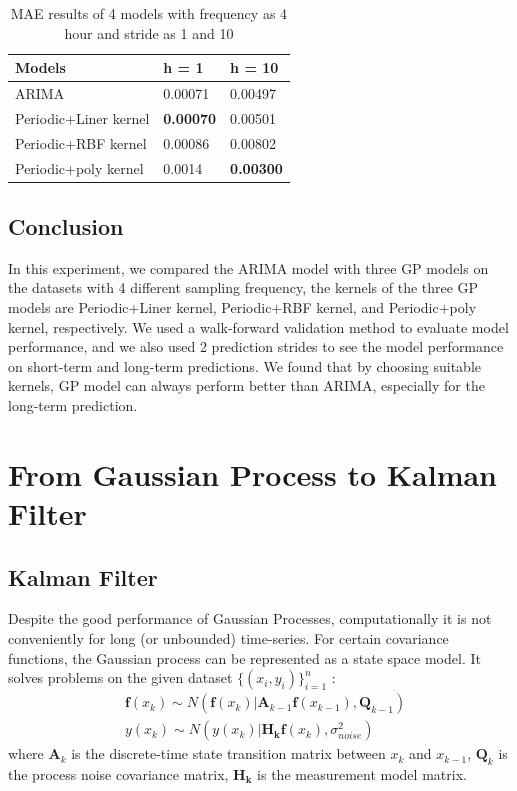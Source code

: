 \documentclass[12pt]{article}
\begin{document}
\begin{table}[H]
\centering
\begin{tabular}{|l|l|l|}
\hline
Models                      & h = 1            & h = 10           \\ \hline
ARIMA                 & 0.00071          & 0.00497          \\ \hline
Periodic+Liner kernel & \textbf{0.00070} & 0.00501          \\ \hline
Periodic+RBF kernel   & 0.00086          & 0.00802          \\ \hline
Periodic+poly kernel  & 0.0014           & \textbf{0.00300} \\ \hline
\end{tabular}
\caption{MAE results of 4 models with frequency as 4 hour and stride as 1 and 10}
\end{table} 

\subsection{Conclusion}
In this experiment, we compared the ARIMA model with three GP models on the datasets with 4 different sampling frequency, the kernels of the three GP models are Periodic+Liner kernel, Periodic+RBF kernel, and Periodic+poly kernel, respectively. We used a walk-forward validation method to evaluate model performance, and we also used 2 prediction strides to see the model performance on short-term and long-term predictions. 
We found that by choosing suitable kernels, GP model can always perform better than ARIMA, especially for the long-term prediction.





\section{From Gaussian Process to Kalman Filter}

\subsection{Kalman Filter}
Despite the good performance of Gaussian Processes, computationally it is not conveniently for long (or unbounded) time-series. For certain covariance functions, the Gaussian process can be represented as a state space model\cite{sarkka:2010:kalmanfilter}. It solves problems on the given dataset $\{(x_i,y_i)\}_{i=1}^n$ :
\begin{equation}
    \begin{split}
     &\bm{f}(x_k)\sim N(\bm{f}(x_k)|\bm{A}_{k-1}\bm{f}(x_{k-1}),\bm{Q}_{k-1}) \\
     &y(x_k)\sim N(y(x_k)|\bm{H_k}\bm{f}(x_k),\sigma_{noise}^2)
\end{split}
\label{eq:discrete SDE}
\end{equation}
where $\bm{A}_k$ is the discrete-time state transition matrix between $x_k$ and $x_{k-1}$, $\bm{Q}_k$ is the process noise covariance matrix, $\bm{H_k}$ is the measurement model matrix.\\ 
\end{document}

